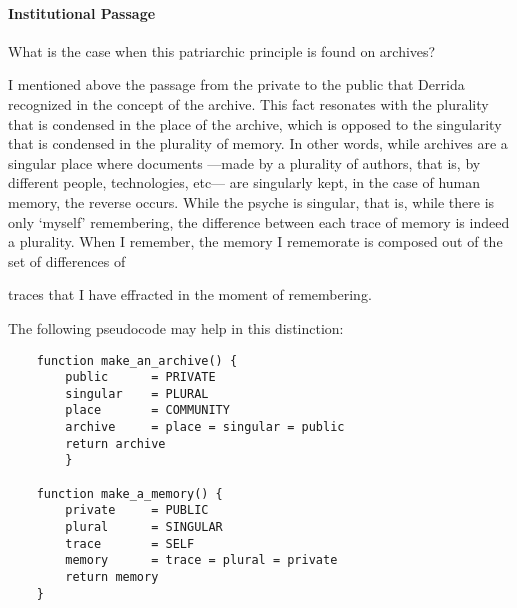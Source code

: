 {	\paragraph{Institutional Passage}
	What is the case when this patriarchic principle is found on archives? 


	I mentioned above the passage from the private to the public that Derrida recognized in the concept of the archive. This fact resonates with the plurality that is condensed in the place of the archive, which is opposed to the singularity that is condensed in the plurality of memory. In other words, while archives are a singular place where documents ---made by a plurality of authors, that is, by different people, technologies, etc--- are singularly kept, in the case of human memory, the reverse occurs. While the psyche is singular, that is, while there is only `myself' remembering, the difference between each trace of memory is indeed a plurality. When I remember, the memory I rememorate is composed out of the set of differences of 

	traces that I have effracted in the moment of remembering. 




	The following pseudocode may help in this distinction:

	\begin{flushleft}
	\small
	\begin{lstlisting}
	function make_an_archive() {
		public 	 	= PRIVATE
		singular 	= PLURAL
		place 	 	= COMMUNITY
		archive  	= place = singular = public
		return archive
		}

	function make_a_memory() {
		private 	= PUBLIC
		plural 		= SINGULAR
		trace 		= SELF
		memory 		= trace = plural = private 
		return memory
	}
	\end{lstlisting}
	\end{flushleft}

}

